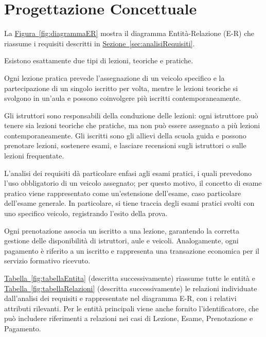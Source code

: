 \documentclass[10pt,twoside]{article}
\begin{document}
\section{Progettazione Concettuale}{
    \label{sec:progettazioneConcettuale}
    La \hyperref[fig:diagrammaER]{Figura~\ref*{fig:diagrammaER}} mostra il diagramma Entità-Relazione (E-R) che riassume i requisiti descritti in \hyperref[sec:analisiRequisiti]{Sezione~\ref*{sec:analisiRequisiti}}.
    
    Esistono esattamente due tipi di lezioni, teoriche e pratiche.

    Ogni lezione pratica prevede l'assegnazione di un veicolo specifico e la partecipazione di un singolo iscritto per volta, mentre le lezioni teoriche si svolgono in un'aula e possono coinvolgere più iscritti contemporaneamente.

    Gli istruttori sono responsabili della conduzione delle lezioni: ogni istruttore può tenere sia lezioni teoriche che pratiche, ma non può essere assegnato a più lezioni contemporaneamente.
    Gli iscritti sono gli allievi della scuola guida e possono prenotare lezioni, sostenere esami, e lasciare recensioni sugli istruttori o sulle lezioni frequentate.

    L’analisi dei requisiti dà particolare enfasi agli esami pratici, i quali prevedono l’uso obbligatorio di un veicolo assegnato; per questo motivo, il concetto di esame pratico viene rappresentato come un'estensione dell'esame, caso particolare dell'esame generale.
    In particolare, si tiene traccia degli esami pratici svolti con uno specifico veicolo, registrando l’esito della prova.

    Ogni prenotazione associa un iscritto a una lezione, garantendo la corretta gestione delle disponibilità di istruttori, aule e veicoli.
    Analogamente, ogni pagamento è riferito a un iscritto e rappresenta una transazione economica per il servizio formativo ricevuto.

    \hyperref[fig:tabellaEntita]{Tabella~\ref*{fig:tabellaEntita}} (descritta successivamente) riassume tutte le entità e \hyperref[fig:tabellaRelazioni]{Tabella~\ref*{fig:tabellaRelazioni}} (descritta successivamente) le relazioni individuate dall'analisi dei requisiti e rappresentate nel diagramma E-R, con i relativi attributi rilevanti.
    Per le entità principali viene anche fornito l'identificatore, che può includere riferimenti a relazioni nei casi di Lezione, Esame, Prenotazione e Pagamento.

}
\end{document}
